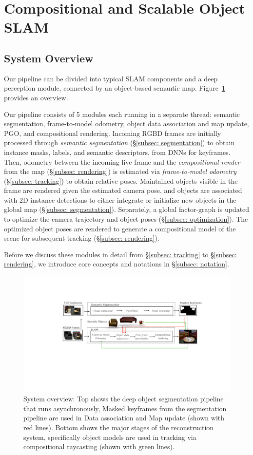 \section{Compositional and Scalable Object SLAM} \label{sec: methodology}

 \subsection{System Overview}
Our pipeline can be divided into typical SLAM components and a deep perception module, connected by an object-based semantic map. Figure~\ref{fig:overview} provides an overview.

%
Our pipeline consists of 5 modules each running in a separate thread: semantic segmentation, frame-to-model odometry, object data association and map update, PGO, and compositional rendering.
%
Incoming RGBD frames are initially processed through  \textit{semantic segmentation} (\S\ref{subsec: segmentation})  to obtain instance masks, labels, and semantic descriptors, from DNNs for keyframes.
%
Then, odometry between the incoming live frame and the \textit{compositional render} from the map (\S\ref{subsec: rendering}) is estimated via \textit{frame-to-model odometry} (\S\ref{subsec: tracking}) to obtain relative poses.
%
Maintained objects visible in the frame are rendered given the estimated camera pose, and objects are associated with 2D instance detections to either integrate or initialize new objects in the global map (\S\ref{subsec: segmentation}).
%
Separately, a global factor-graph is updated to optimize the camera trajectory and object poses (\S\ref{subsec: optimization}). The optimized object poses are rendered to generate a compositional model of the scene for subsequent tracking (\S\ref{subsec: rendering}).

Before we discuss these modules in detail from \S\ref{subsec: tracking} to \S\ref{subsec: rendering}, we introduce core concepts and notations in \S\ref{subsec: notation}.

 \begin{figure}[htbp]
 	\centering
    \includegraphics[width=\linewidth]{figs/icra2021-compressed.pdf}
    \caption{\label{fig:overview} System overview: Top shows the deep object segmentation pipeline that runs asynchronously, Masked keyframes from the segmentation pipeline are used in Data association and Map update (shown with red lines). Bottom shows the major stages of the reconstruction system, specifically object models are used in tracking via compositional raycasting (shown with green lines).}
 \end{figure}
